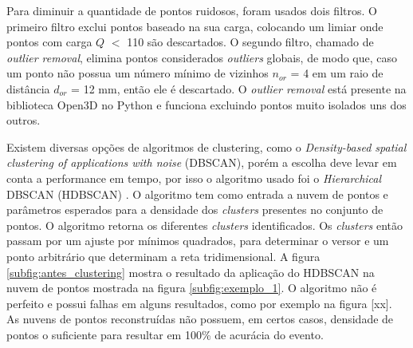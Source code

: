 \documentclass[a4paper,12pt,oneside]{book}
\begin{document}
\par Para diminuir a quantidade de pontos ruidosos, foram usados dois filtros. O primeiro filtro exclui pontos baseado na sua carga, colocando um limiar onde pontos com carga $Q$ $<$ 110 são descartados. O segundo filtro, chamado de \textit{outlier removal}, elimina pontos considerados \textit{outliers} globais, de modo que, caso um ponto não possua um número mínimo de vizinhos $n_{or}$ = 4 em um raio de distância $d_{or}$ = 12 mm, então ele é descartado. O \textit{outlier removal} está presente na biblioteca Open3D\cite{open3d} no Python e funciona excluindo pontos muito isolados uns dos outros.

\par Existem diversas opções de algoritmos de clustering, como o \textit{Density-based spatial clustering of applications with noise} (DBSCAN)\cite{dbscan}, porém a escolha deve levar em conta a performance em tempo, por isso o algoritmo usado foi o \textit{Hierarchical} DBSCAN (HDBSCAN) \cite{hdbscan1, hdbscan2}. O algoritmo tem como entrada a nuvem de pontos e parâmetros esperados para a densidade dos \textit{clusters} presentes no conjunto de pontos. O algoritmo retorna os diferentes \textit{clusters} identificados. Os \textit{clusters} então passam por um ajuste por mínimos quadrados, para determinar o versor e um ponto arbitrário que determinam a reta tridimensional. A figura \ref{subfig:antes_clustering} mostra o resultado da aplicação do HDBSCAN na nuvem de pontos mostrada na figura \ref{subfig:exemplo_1}. O algoritmo não é perfeito e possui falhas em alguns resultados, como por exemplo na figura [xx]. As nuvens de pontos reconstruídas não possuem, em certos casos, densidade de pontos o suficiente para resultar em 100\% de acurácia do evento.
\end{document}
